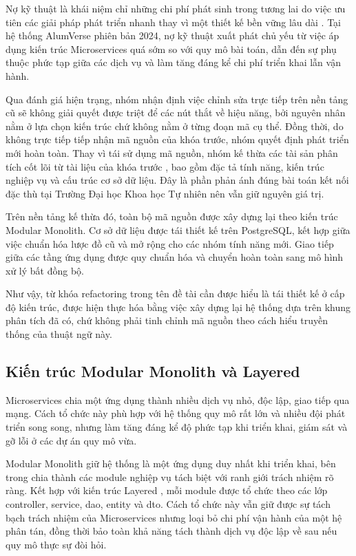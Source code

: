 \documentclass[12pt,a4paper,oneside]{report}
\begin{document}
Nợ kỹ thuật là khái niệm chỉ những chi phí phát sinh trong tương lai do việc ưu tiên các giải pháp phát triển nhanh thay vì một thiết kế bền vững lâu dài \cite{cunningham,fowlerref}. Tại hệ thống AlumVerse phiên bản 2024, nợ kỹ thuật xuất phát chủ yếu từ việc áp dụng kiến trúc Microservices quá sớm so với quy mô bài toán, dẫn đến sự phụ thuộc phức tạp giữa các dịch vụ và làm tăng đáng kể chi phí triển khai lẫn vận hành.

Qua đánh giá hiện trạng, nhóm nhận định việc chỉnh sửa trực tiếp trên nền tảng cũ sẽ không giải quyết được triệt để các nút thắt về hiệu năng, bởi nguyên nhân nằm ở lựa chọn kiến trúc chứ không nằm ở từng đoạn mã cụ thể. Đồng thời, do không trực tiếp tiếp nhận mã nguồn của khóa trước, nhóm quyết định phát triển mới hoàn toàn. Thay vì tái sử dụng mã nguồn, nhóm kế thừa các tài sản phân tích cốt lõi từ tài liệu của khóa trước \cite{alumverse}, bao gồm đặc tả tính năng, kiến trúc nghiệp vụ và cấu trúc cơ sở dữ liệu. Đây là phần phản ánh đúng bài toán kết nối đặc thù tại Trường Đại học Khoa học Tự nhiên nên vẫn giữ nguyên giá trị.

Trên nền tảng kế thừa đó, toàn bộ mã nguồn được xây dựng lại theo kiến trúc Modular Monolith. Cơ sở dữ liệu được tái thiết kế trên PostgreSQL, kết hợp giữa việc chuẩn hóa lược đồ cũ và mở rộng cho các nhóm tính năng mới. Giao tiếp giữa các tầng ứng dụng được quy chuẩn hóa và chuyển hoàn toàn sang mô hình xử lý bất đồng bộ.

Như vậy, từ khóa refactoring trong tên đề tài cần được hiểu là tái thiết kế ở cấp độ kiến trúc, được hiện thực hóa bằng việc xây dựng lại hệ thống dựa trên khung phân tích đã có, chứ không phải tinh chỉnh mã nguồn theo cách hiểu truyền thống của thuật ngữ này.

\subsection{Kiến trúc Modular Monolith và Layered}

Microservices \cite{microservices} chia một ứng dụng thành nhiều dịch vụ nhỏ, độc lập, giao tiếp qua mạng. Cách tổ chức này phù hợp với hệ thống quy mô rất lớn và nhiều đội phát triển song song, nhưng làm tăng đáng kể độ phức tạp khi triển khai, giám sát và gỡ lỗi ở các dự án quy mô vừa.

Modular Monolith giữ hệ thống là một ứng dụng duy nhất khi triển khai, bên trong chia thành các module nghiệp vụ tách biệt với ranh giới trách nhiệm rõ ràng. Kết hợp với kiến trúc Layered \cite{poeaa}, mỗi module được tổ chức theo các lớp controller, service, dao, entity và dto. Cách tổ chức này vẫn giữ được sự tách bạch trách nhiệm của Microservices nhưng loại bỏ chi phí vận hành của một hệ phân tán, đồng thời bảo toàn khả năng tách thành dịch vụ độc lập về sau nếu quy mô thực sự đòi hỏi.
\end{document}
